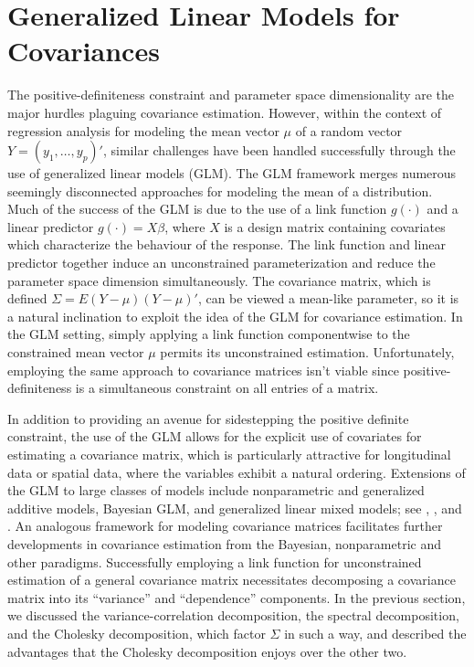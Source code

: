 \section{Generalized Linear Models for Covariances} \label{covariance-glms}


The positive-definiteness constraint and parameter space dimensionality are the major hurdles plaguing covariance estimation. However, within the context of regression analysis for modeling the mean vector $\mu$ of a random vector $Y = \left(y_1, \dots , y_p\right)'$, similar challenges have been handled successfully through the use of generalized linear models (GLM). The GLM framework \cite{McCullagh1989} merges numerous seemingly disconnected approaches for modeling the mean of a distribution. Much of the success of the GLM is due to the use of a link function $g\left(\cdot\right)$ and a linear predictor $g\left(\cdot\right) = X\beta$, where $X$ is a design matrix containing covariates which characterize the behaviour of the response. The link function and linear predictor together induce an unconstrained parameterization and reduce the parameter space dimension simultaneously.  The covariance matrix, which is defined $\Sigma = E\left(Y - \mu\right)\left(Y - \mu\right)'$, can be viewed a mean-like parameter, so it is a natural inclination to exploit the idea of the GLM for covariance estimation. In the GLM setting, simply applying a link function componentwise to the constrained mean vector $\mu$ permits its unconstrained estimation. Unfortunately, employing the same approach to covariance matrices isn't viable since positive-definiteness is a simultaneous constraint on all entries of a matrix. 

\bigskip

In addition to providing an avenue for sidestepping the positive definite constraint, the use of the GLM allows for the explicit use of covariates for estimating a covariance matrix, which is particularly attractive for longitudinal data or spatial data, where the variables exhibit a natural ordering. Extensions of the GLM to large classes of models include nonparametric and generalized additive models, Bayesian GLM, and generalized linear mixed models; see \cite{hastie1990generalized},  \cite{dey2000generalized}, and \cite{mcculloch2001generalized}. An analogous framework for modeling covariance matrices facilitates further developments in covariance estimation from the Bayesian, nonparametric and other paradigms. Successfully employing a link function for unconstrained estimation of a general covariance matrix necessitates decomposing a covariance matrix into its ``variance'' and ``dependence'' components. In the previous section, we discussed  the variance-correlation decomposition, the spectral decomposition, and the Cholesky decomposition, which factor $\Sigma$ in such a way, and described the advantages that the Cholesky decomposition enjoys over the other two.  


